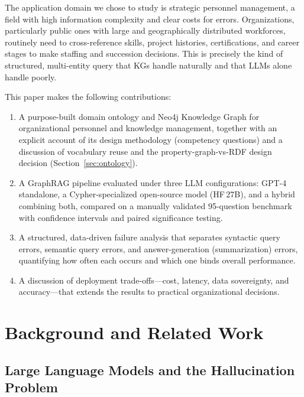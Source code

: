 \documentclass{ceurart}
\begin{document}
The application domain we chose to study is strategic personnel management, a
field with high information complexity and clear costs for errors. Organizations,
particularly public ones with large and geographically distributed workforces,
routinely need to cross-reference skills, project histories, certifications, and
career stages to make staffing and succession decisions. This is precisely the kind
of structured, multi-entity query that KGs handle naturally and that LLMs alone
handle poorly.

This paper makes the following contributions:
\begin{enumerate}
  \item A purpose-built domain ontology and Neo4j Knowledge Graph for
        organizational personnel and knowledge management, together with an
        explicit account of its design methodology (competency questions) and a
        discussion of vocabulary reuse and the property-graph-vs-RDF design
        decision (Section~\ref{sec:ontology}).
  \item A GraphRAG pipeline evaluated under three LLM configurations: GPT-4
        standalone, a Cypher-specialized open-source model (HF\,27B), and a hybrid
        combining both, compared on a manually validated 95-question benchmark
        with confidence intervals and paired significance testing.
  \item A structured, data-driven failure analysis that separates syntactic query
        errors, semantic query errors, and answer-generation (summarization)
        errors, quantifying how often each occurs and which one binds overall
        performance.
  \item A discussion of deployment trade-offs---cost, latency, data sovereignty,
        and accuracy---that extends the results to practical organizational decisions.
\end{enumerate}

\section{Background and Related Work}

\subsection{Large Language Models and the Hallucination Problem}
\end{document}
